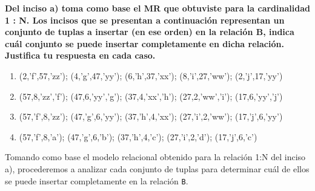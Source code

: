 \textbf{Del inciso a) toma como base el MR que obtuviste para la cardinalidad 1 : N. Los incisos que se presentan a
continuación representan un conjunto de tuplas a insertar (en ese orden) en la relación B, indica cuál conjunto se
puede insertar completamente en dicha relación. Justifica tu respuesta en cada caso.}\vspace{.3cm}

\begin{enumerate}
    \item (2,’f’,57,’zz’); (4,’g’,47,’yy’); (6,’h’,37,’xx’); (8,’i’,27,’ww’); (2,’j’,17,’yy’)
    \item (57,8,’zz’,’f’); (47,6,’yy’,’g’); (37,4,’xx’,’h’); (27,2,’ww’,’i’); (17,6,’yy’,’j’)
    \item (57,’f’,8,’zz’); (47,’g’,6,’yy’); (37,’h’,4,’xx’); (27,’i’,2,’ww’); (17,’j’,6,’yy’)
    \item (57,’f’,8,’a’); (47,’g’,6,’b’); (37,’h’,4,’c’); (27,’i’,2,’d’); (17,’j’,6,’c’)
\end{enumerate}

\vspace{.5cm}

Tomando como base el modelo relacional obtenido para la relación 1:N del inciso a), procederemos a analizar cada conjunto de tuplas para determinar cuál de ellos se puede insertar completamente en la relación \texttt{B}. \\

